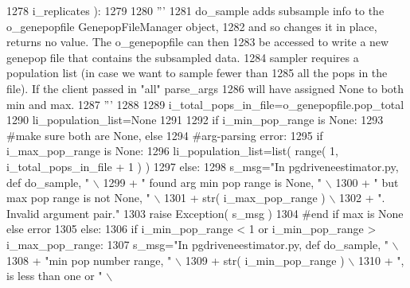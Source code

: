 \begin{DoxyCode}
1278                 i\_replicates ):
1279 
1280     \textcolor{stringliteral}{'''}
1281 \textcolor{stringliteral}{    do\_sample adds subsample info to the o\_genepopfile GenepopFileManager object,}
1282 \textcolor{stringliteral}{    and so changes it in place, returns no value.  The o\_genepopfile can then}
1283 \textcolor{stringliteral}{    be accessed to write a new genepop file that contains the subsampled data.}
1284 \textcolor{stringliteral}{    sampler requires a population list (in case we want to sample fewer than}
1285 \textcolor{stringliteral}{    all the pops in the file). If the client passed in "all" parse\_args}
1286 \textcolor{stringliteral}{    will have assigned None to both min and max.}
1287 \textcolor{stringliteral}{    '''}
1288 
1289     i\_total\_pops\_in\_file=o\_genepopfile.pop\_total
1290     li\_population\_list=\textcolor{keywordtype}{None}
1291 
1292     \textcolor{keywordflow}{if} i\_min\_pop\_range \textcolor{keywordflow}{is} \textcolor{keywordtype}{None}:
1293         \textcolor{comment}{#make sure both are None, else}
1294         \textcolor{comment}{#arg-parsing error:}
1295         \textcolor{keywordflow}{if} i\_max\_pop\_range \textcolor{keywordflow}{is} \textcolor{keywordtype}{None}:
1296             li\_population\_list=list( range( 1, i\_total\_pops\_in\_file + 1 ) )
1297         \textcolor{keywordflow}{else}:
1298             s\_msg=\textcolor{stringliteral}{"In pgdriveneestimator.py, def do\_sample, "} \(\backslash\)
1299                         + \textcolor{stringliteral}{" found arg min pop range is None, "} \(\backslash\)
1300                         + \textcolor{stringliteral}{" but max pop range is not None, "} \(\backslash\)
1301                         + str( i\_max\_pop\_range ) \(\backslash\)
1302                         + \textcolor{stringliteral}{".  Invalid argument pair."}
1303             \textcolor{keywordflow}{raise} Exception( s\_msg )
1304         \textcolor{comment}{#end if max is None else error}
1305     \textcolor{keywordflow}{else}:
1306         \textcolor{keywordflow}{if} i\_min\_pop\_range < 1 \textcolor{keywordflow}{or} i\_min\_pop\_range > i\_max\_pop\_range:
1307             s\_msg=\textcolor{stringliteral}{"In pgdriveneestimator.py, def do\_sample, "} \(\backslash\)
1308                         + \textcolor{stringliteral}{"min pop number range, "} \(\backslash\)
1309                         + str( i\_min\_pop\_range ) \(\backslash\)
1310                         + \textcolor{stringliteral}{", is less than one or "} \(\backslash\)

\end{DoxyCode}
